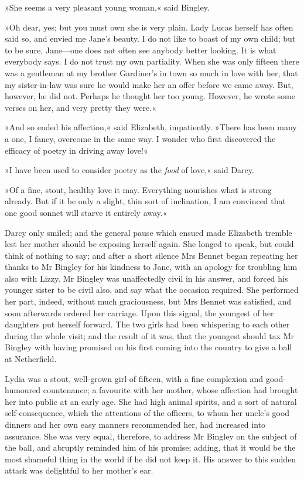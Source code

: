 »She seems a very pleasant young woman,« said Bingley.

»Oh dear, yes; but you must own she is very plain. Lady Lucas herself has often said so, and envied me Jane's beauty. I do not like to boast of my own child; but to be sure, Jane—one does not often see anybody better looking. It is what everybody says. I do not trust my own partiality. When she was only fifteen there was a gentleman at my brother Gardiner's in town so much in love with her, that my sister-in-law was sure he would make her an offer before we came away. But, however, he did not. Perhaps he thought her too young. However, he wrote some verses on her, and very pretty they were.«

»And so ended his affection,« said Elizabeth, impatiently. »There has been many a one, I fancy, overcome in the same way. I wonder who first discovered the efficacy of poetry in driving away love!«

»I have been used to consider poetry as the \textit{food} of love,« said Darcy.

»Of a fine, stout, healthy love it may. Everything nourishes what is strong already. But if it be only a slight, thin sort of inclination, I am convinced that one good sonnet will starve it entirely away.«

Darcy only smiled; and the general pause which ensued made Elizabeth tremble lest her mother should be exposing herself again. She longed to speak, but could think of nothing to say; and after a short silence Mrs Bennet began repeating her thanks to Mr Bingley for his kindness to Jane, with an apology for troubling him also with Lizzy. Mr Bingley was unaffectedly civil in his answer, and forced his younger sister to be civil also, and say what the occasion required. She performed her part, indeed, without much graciousness, but Mrs Bennet was satisfied, and soon afterwards ordered her carriage. Upon this signal, the youngest of her daughters put herself forward. The two girls had been whispering to each other during the whole visit; and the result of it was, that the youngest should tax Mr Bingley with having promised on his first coming into the country to give a ball at Netherfield.

Lydia was a stout, well-grown girl of fifteen, with a fine complexion and good-humoured countenance; a favourite with her mother, whose affection had brought her into public at an early age. She had high animal spirits, and a sort of natural \newline self-consequence, which the attentions of the officers, to whom her uncle's good dinners and her own easy manners recommended her, had increased into assurance. She was very equal, therefore, to address Mr Bingley on the subject of the ball, and abruptly reminded him of his promise; adding, that it would be the most shameful thing in the world if he did not keep it. His answer to this sudden attack was delightful to her mother's ear.

